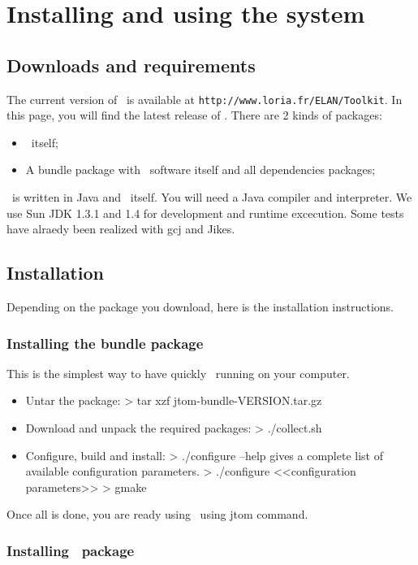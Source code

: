 \section{Installing and using the system}

\subsection{Downloads and requirements}
The current version of \TOM\ is available at
  \texttt{http://www.loria.fr/ELAN/Toolkit}.
In this page, you will find the latest release of \TOM. There are 2
kinds of packages:
\begin{itemize}
\item \TOM\ itself;
\item A bundle package with \TOM\ software itself and all dependencies
  packages;
\end{itemize}

\TOM\ is written in Java and \TOM\ itself. You will need a Java
compiler and interpreter. 
We use Sun JDK 1.3.1 and 1.4 for development and runtime
excecution. Some tests have alraedy been realized with gcj
and Jikes.
\subsection{Installation}
Depending on the package you download, here is the installation
instructions.

\subsubsection{Installing the bundle package}
This is the simplest way to have quickly \TOM\ running on your
computer.
\begin{itemize}
\item Untar the package: 
  > tar xzf jtom-bundle-VERSION.tar.gz
\item Download and unpack the required packages:
  > ./collect.sh
\item Configure, build and install:
  > ./configure --help gives a complete list of available configuration parameters.
  > ./configure <<configuration parameters>>
  > gmake
\end{itemize}

Once all is done, you are ready using \TOM\ using jtom command.

\subsubsection{Installing \TOM\ package}

